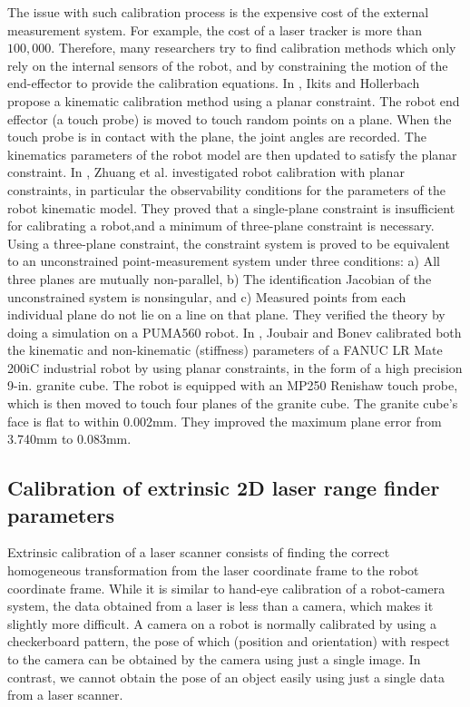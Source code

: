 The issue with such calibration process is the expensive cost of the external measurement system. For example, the cost of a laser tracker is more than $100,000$\cite{Nubiola2013}. Therefore, many researchers try to find calibration methods which only rely on the internal sensors of the robot, and by constraining the motion of the end-effector to provide the calibration equations. 
In \cite{Ikits1997}, Ikits and Hollerbach propose a kinematic calibration method using a planar constraint. The robot end effector (a touch probe) is moved to touch random points on a plane. When the touch probe is in contact with the plane, the joint angles are recorded. The kinematics parameters of the robot model are then updated to satisfy the planar constraint. 
In \cite{Zhuang1999}, Zhuang et al. investigated robot calibration with planar constraints, in particular the observability conditions for the parameters of the robot kinematic model. They proved that a single-plane constraint is insufficient for calibrating a robot,and a minimum of three-plane constraint is necessary. Using a three-plane constraint, the constraint system is proved to be equivalent to an unconstrained point-measurement system under three conditions: a) All three planes are mutually non-parallel, b) The identification Jacobian of the unconstrained system is nonsingular, and c) Measured points from each individual plane do not lie on a line on that plane. They verified the theory by doing a simulation on a PUMA560 robot. 
In \cite{Joubair2015}, Joubair and Bonev calibrated both the kinematic and non-kinematic (stiffness) parameters of a FANUC LR Mate 200iC industrial robot by using planar constraints, in the form of a high precision 9-in. granite cube. The robot is equipped with an MP250 Renishaw touch probe, which is then moved to touch four planes of the granite cube. The granite cube's face is flat to within 0.002mm. They improved the maximum plane error from 3.740mm to 0.083mm. 

\subsection{Calibration of extrinsic 2D laser range finder parameters}
\label{sec:laser_calib}
Extrinsic calibration of a laser scanner consists of finding the correct homogeneous transformation from the laser coordinate frame to the robot coordinate frame. While it is similar to hand-eye calibration of a robot-camera system, the data obtained from a laser is less than a camera, which makes it slightly more difficult. A camera on a robot is normally calibrated by using a checkerboard pattern, the pose of which (position and orientation) with respect to the camera can be obtained by the camera using just a single image. In contrast, we cannot obtain the pose of an object easily using just a single data from a laser scanner. 

